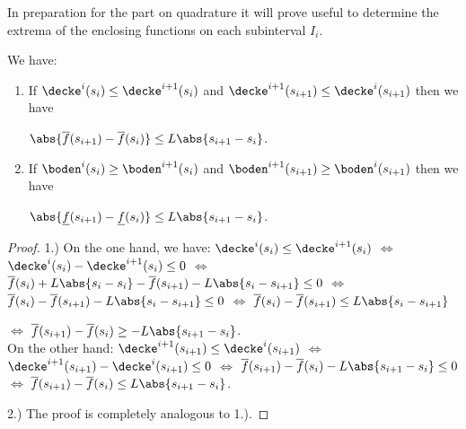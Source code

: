 %
%
%
%



In preparation for the part on quadrature it will prove useful to determine the extrema of the enclosing functions on each subinterval $I_i$.


\begin{lem} \label{lem:Lipbetweensamples}
We have:
\begin{enumerate}
\item If $\decke^i(s_i)  \leq \decke^{i+1}(s_i)$ and $\decke^{i+1}(s_{i+1})  \leq \decke^i(s_{i+1})$ then 
we have 

$ \abs{\overline f(s_{i+1})- \overline f(s_i)} \leq L \abs{s_{i+1} -s_i}$.
\item If $\boden^i(s_i)  \geq \boden^{i+1}(s_i)$ and $\boden^{i+1}(s_{i+1})  \geq \boden^i(s_{i+1})$ then 
we have

$ \abs{\underline f(s_{i+1})- \underline f(s_i)} \leq L \abs{s_{i+1} -s_i}$.
\end{enumerate}

\begin{proof}
1.) 
On the one hand, we have:
$\decke^i(s_i)  \leq \decke^{i+1}(s_i)$ 
$\Leftrightarrow$
 $\decke^i(s_i) - \decke^{i+1}(s_i)  \leq 0$
%
$\Leftrightarrow$ $ \overline f(s_i) + L \abs{s_i-s_i} -\overline f(s_{i+1}) - L \abs{s_i-s_{i+1}}  \leq 0$
%
$\Leftrightarrow$ $ \overline f(s_i) -\overline f(s_{i+1}) - L \abs{s_i-s_{i+1}}  \leq 0$
%
$\Leftrightarrow$ $ \overline f(s_i) -\overline f(s_{i+1})   \leq  L \abs{s_i-s_{i+1}}$

$\Leftrightarrow$ $ \overline f(s_{i+1})-\overline f(s_i)    \geq  -L \abs{s_{i+1} - s_i}$.\\
%
On the other hand:
$\decke^{i+1}(s_{i+1})  \leq \decke^i(s_{i+1})$
%
$\Leftrightarrow$ $\decke^{i+1}(s_{i+1}) - \decke^i(s_{i+1}) \leq 0$
$\Leftrightarrow$ $\overline f(s_{i+1})  - \overline f(s_i) - L \abs{s_{i+1} -s_i} \leq 0$
$\Leftrightarrow$ $\overline f(s_{i+1})  - \overline f(s_i)  \leq  L \abs{s_{i+1} -s_i}$.

2.) The proof is completely analogous to 1.). 
\end{proof}
\end{lem}


